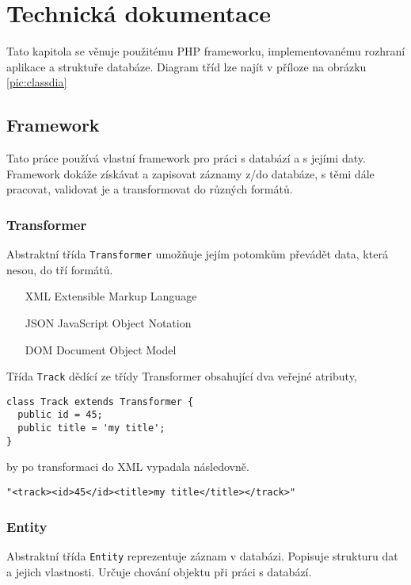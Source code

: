 \documentclass[12pt]{article}
\begin{document}
\newpage

\section{Technická dokumentace}

Tato kapitola se věnuje použitému PHP frameworku, implementovanému rozhraní aplikace a struktuře databáze.
Diagram tříd lze najít v příloze na obrázku \ref{pic:classdia}

\subsection{Framework}
Tato práce používá vlastní framework pro práci s databází a s jejími daty. Framework dokáže získávat a zapisovat záznamy z/do databáze, s těmi dále pracovat, validovat je a transformovat do různých formátů.

\subsubsection{Transformer}
Abstraktní třída \texttt{Transformer} umožňuje jejím potomkům převádět data, která nesou, do tří formátů.

\begin{itemize}
  \item[XML] Extensible Markup Language
  \item[JSON] JavaScript Object Notation
  \item[DOM] Document Object Model
\end{itemize}

Třída \texttt{Track} dědící ze třídy Transformer obsahující dva veřejné atributy,

\begin{lstlisting}
class Track extends Transformer {
  public id = 45;
  public title = 'my title';
}
\end{lstlisting}

by po transformaci do XML vypadala následovně.

\begin{lstlisting}
"<track><id>45</id><title>my title</title></track>"
\end{lstlisting}

\subsubsection{Entity} \label{entity}
Abstraktní třída \texttt{Entity} reprezentuje záznam v databázi. Popisuje strukturu dat a jejich vlastnosti. Určuje chování objektu při práci s databází.
\end{document}
